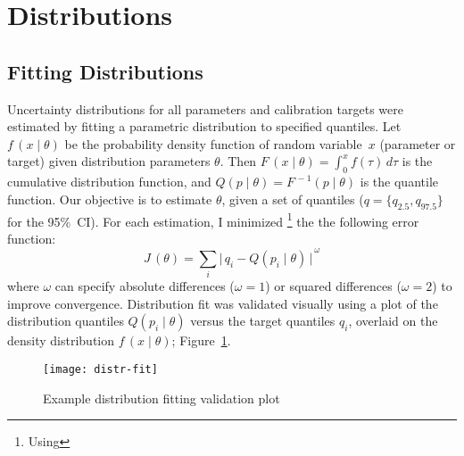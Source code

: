 \section{Distributions}\label{app.math.distr}
\subsection{Fitting Distributions}\label{app.math.distr.fit}
Uncertainty distributions for all parameters and calibration targets were estimated by
fitting a parametric distribution to specified quantiles.
Let $f\,(x\mid\theta)$ be
the probability density function of random variable~$x$ (parameter or target)
given distribution parameters $\theta$.
Then $F\,(x\mid\theta) = \int_0^x f(\tau)\,d\tau$ is the cumulative distribution function,
and $Q(p\mid\theta) = F^{\,-1}(p\mid\theta)$ is the quantile function.
Our objective is to estimate $\theta$, given a set of quantiles
(\eg $q = \{q_{2.5},q_{97.5}\}$ for the 95\%~CI).
For each estimation, I minimized%
\footnote{Using }
the the following error function:
\begin{equation}
  J\,(\theta) = \sum_i {\big|\,q_i - Q(p_i\mid\theta)\,\big|}^{\,\omega}
\end{equation}
where $\omega$ can specify absolute differences ($\omega=1$) or squared differences ($\omega=2$)
to improve convergence.
Distribution fit was validated visually using a plot of
the distribution quantiles $Q(p_i\mid\theta)$ versus the target quantiles $q_i$,
overlaid on the density distribution $f\,(x\mid\theta)$; \eg Figure~\ref{fig:distr.fit}.
\begin{figure}[h]
  \centering
  \texttt{[image: distr-fit]}
  \caption{Example distribution fitting validation plot}
  \label{fig:distr.fit}
\end{figure}
